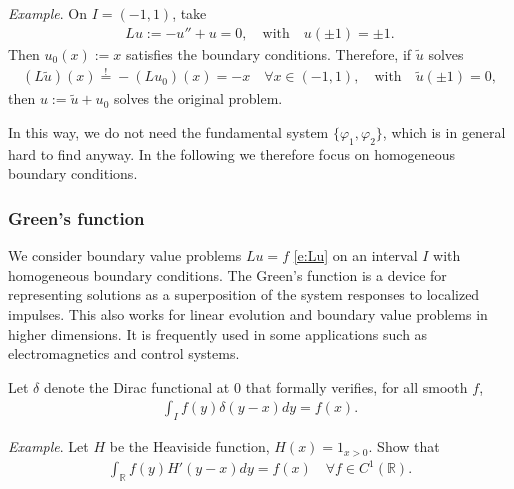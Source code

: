 \documentclass[12pt,a4paper]{article}
\newcommand{\IR}{\mathbb{R}}
\begin{document}
    
    \emph{Example}.
    On $I = (-1, 1)$,
    take
    \begin{align}
        L u := -u'' + u = 0,
        \quad\text{with}\quad
        u(\pm 1) = \pm 1
        .
    \end{align}
    Then $u_0(x) := x$ satisfies the boundary conditions.
    Therefore, if $\tilde{u}$ solves
    \begin{align}
        (L \tilde{u})(x) \stackrel{!}{=} -(L u_0)(x) = -x
        \quad
        \forall x \in (-1, 1),
        \quad\text{with}\quad
        \tilde{u}(\pm 1) = 0,
    \end{align}
    then $u := \tilde{u} + u_0$ solves the original problem.
    
    
    In this way,
    we do not need 
    the fundamental system $\{ \varphi_1, \varphi_2 \}$,
    which is in general hard to find anyway.
    In the following we therefore focus on 
    homogeneous boundary conditions.
    
    
    \subsubsection*{Green's function}
    
    We consider boundary value problems 
    $L u = f$ \eqref{e:Lu}
    on an interval $I$
    with homogeneous boundary conditions.
    The Green's function is a device
    for representing solutions 
    as a superposition
    of
    the system responses to localized impulses.
    This also works for 
    linear evolution and boundary value problems 
    in higher dimensions.
    It is frequently used in some applications
    such as electromagnetics and control systems.
    
    
    Let $\delta$ denote the Dirac functional at $0$
    that formally verifies, for all smooth $f$, 
    \begin{align}
        \label{e:delta}
        \int_I f(y) \delta(y - x) dy
        =
        f(x)
        .
    \end{align}
    
    
    \emph{Example}.
    Let $H$ be the Heaviside function,
    $H(x) = 1_{x > 0}$.
    Show that
    \begin{align}
        \int_{\IR} f(y) H'(y - x) dy
        =
        f(x)
        \quad
        \forall f \in C^1(\IR)
        .
    \end{align}
    
\end{document}
